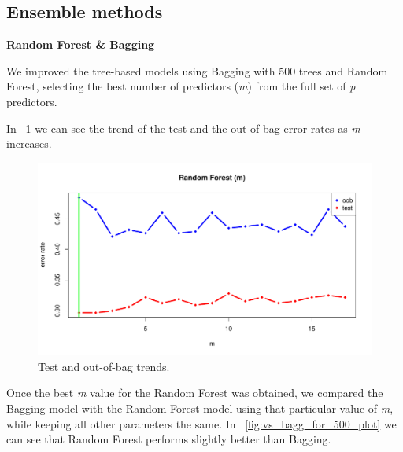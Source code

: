 \subsection{Ensemble methods}

\vspace{0.2cm}
\noindent
\textbf{Random Forest \& Bagging}

We improved the tree-based models using Bagging with 500 trees and Random Forest, selecting the best number of predictors (\textit{m}) from the full set of \textit{p} predictors.

In \Fig~\ref{fig:m_best_for_500_plot} we can see the trend of the test and the out-of-bag error rates as \textit{m} increases.

\begin{figure}[h]
	\centering
	\includegraphics[width=0.5\linewidth]{ImageFiles/Classification/Trees/m_best_for_500_plot}
	\caption{Test and out-of-bag trends.}
	\label{fig:m_best_for_500_plot}
\end{figure}

Once the best \textit{m} value for the Random Forest was obtained, we compared the Bagging model with the Random Forest model using that particular value of \textit{m}, while keeping all other parameters the same.
In \Fig~\ref{fig:vs_bagg_for_500_plot} we can see that Random Forest performs slightly better than Bagging.

